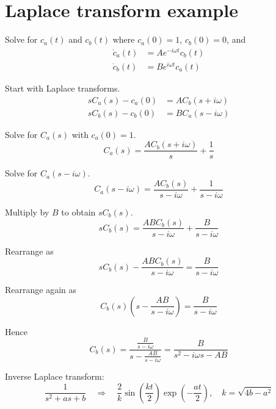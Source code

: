 

\section*{Laplace transform example}

Solve for $c_a(t)$ and $c_b(t)$ where $c_a(0)=1$, $c_b(0)=0$, and
\begin{align*}
\dot c_a(t)&=Ae^{-i\omega t}c_b(t)
\\
\dot c_b(t)&=Be^{i\omega t}c_a(t)
\end{align*}

Start with Laplace transforms.
\begin{align*}
sC_a(s)-c_a(0)&=AC_b(s+i\omega)
\\
sC_b(s)-c_b(0)&=BC_a(s-i\omega)
\end{align*}

Solve for $C_a(s)$ with $c_a(0)=1$.
\begin{equation*}
C_a(s)=\frac{AC_b(s+i\omega)}{s}+\frac{1}{s}
\end{equation*}

Solve for $C_a(s-i\omega)$.
\begin{equation*}
C_a(s-i\omega)=\frac{AC_b(s)}{s-i\omega}+\frac{1}{s-i\omega}
\end{equation*}

Multiply by $B$ to obtain $sC_b(s)$.
\begin{equation*}
sC_b(s)=\frac{ABC_b(s)}{s-i\omega}+\frac{B}{s-i\omega}
\end{equation*}

Rearrange as
\begin{equation*}
sC_b(s)-\frac{ABC_b(s)}{s-i\omega}=\frac{B}{s-i\omega}
\end{equation*}

Rearrange again as
\begin{equation*}
C_b(s)\left(s-\frac{AB}{s-i\omega}\right)=\frac{B}{s-i\omega}
\end{equation*}

Hence
\begin{equation*}
C_b(s)=\frac
{\displaystyle\frac{B}{s-i\omega}}
{\displaystyle s-\frac{AB}{s-i\omega}}
=\frac{B}{s^2-i\omega s-AB}
\end{equation*}

Inverse Laplace transform:
\begin{equation*}
\frac{1}{s^2+as+b}\quad\Rightarrow\quad
\frac{2}{k}\sin\left(\frac{kt}{2}\right)\exp\left(-\frac{at}{2}\right),\quad
k=\sqrt{4b-a^2}
\end{equation*}

